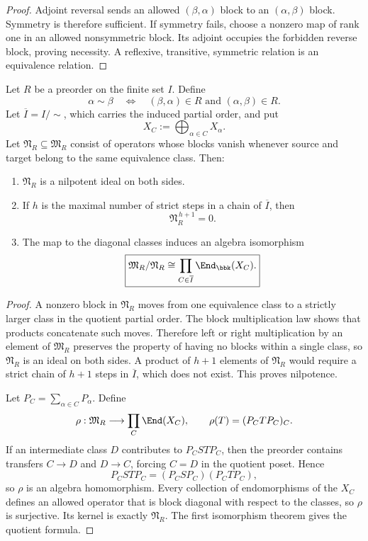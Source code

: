 \begin{proof}
Adjoint reversal sends an allowed $(\beta,\alpha)$ block to an $(\alpha,\beta)$ block.  Symmetry is therefore sufficient.  If symmetry fails, choose a nonzero map of rank one in an allowed nonsymmetric block.  Its adjoint occupies the forbidden reverse block, proving necessity.  A reflexive, transitive, symmetric relation is an equivalence relation.
\end{proof}

\begin{theorem}
\label{thm:preorder-decomposition}
Let $R$ be a preorder on the finite set $I$.  Define
\[
\alpha\sim\beta
\quad\Longleftrightarrow\quad
(\beta,\alpha)\in R\text{ and }(\alpha,\beta)\in R.
\]
Let $\overline I=I/{\sim}$, which carries the induced partial order, and put
\[
X_C:=\bigoplus_{\alpha\in C}X_\alpha.
\]
Let $\mathfrak N_R\subseteq\mathfrak M_R$ consist of operators whose blocks vanish whenever source and target belong to the same equivalence class.  Then:
\begin{enumerate}[label=(\roman*)]
\item $\mathfrak N_R$ is a nilpotent ideal on both sides.
\item If $h$ is the maximal number of strict steps in a chain of $\overline I$, then
\[
\mathfrak N_R^{\,h+1}=0.
\]
\item The map to the diagonal classes induces an algebra isomorphism
\[
\boxed{
\mathfrak M_R/\mathfrak N_R
\cong
\prod_{C\in\overline I}\End_{\bbk}(X_C).
}
\]
\end{enumerate}
\end{theorem}

\begin{proof}
A nonzero block in $\mathfrak N_R$ moves from one equivalence class to a strictly larger class in the quotient partial order.  The block multiplication law shows that products concatenate such moves.  Therefore left or right multiplication by an element of $\mathfrak M_R$ preserves the property of having no blocks within a single class, so $\mathfrak N_R$ is an ideal on both sides.  A product of $h+1$ elements of $\mathfrak N_R$ would require a strict chain of $h+1$ steps in $\overline I$, which does not exist.  This proves nilpotence.

Let $P_C=\sum_{\alpha\in C}P_\alpha$.  Define
\[
\rho:\mathfrak M_R\longrightarrow\prod_C\End(X_C),
\qquad
\rho(T)=(P_CTP_C)_C.
\]
If an intermediate class $D$ contributes to $P_CSTP_C$, then the preorder contains transfers $C\to D$ and $D\to C$, forcing $C=D$ in the quotient poset.  Hence
\[
P_CSTP_C=(P_CSP_C)(P_CTP_C),
\]
so $\rho$ is an algebra homomorphism.  Every collection of endomorphisms of the $X_C$ defines an allowed operator that is block diagonal with respect to the classes, so $\rho$ is surjective.  Its kernel is exactly $\mathfrak N_R$.  The first isomorphism theorem gives the quotient formula.
\end{proof}

